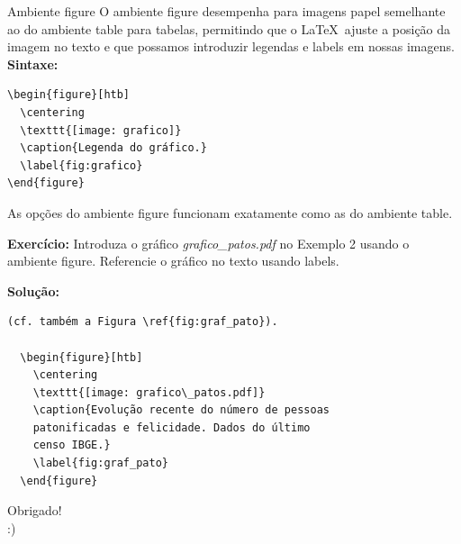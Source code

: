 \documentclass[12pt]{beamer}
\begin{document}
\begin{frame}[fragile]{Ambiente figure}
O ambiente figure desempenha para imagens papel semelhante ao do ambiente table para tabelas, permitindo que o \LaTeX\ ajuste a posição da imagem no texto e que possamos introduzir legendas e labels em nossas imagens.\\

\textbf{Sintaxe: }
\begin{verbatim}
\begin{figure}[htb]
  \centering
  \texttt{[image: grafico]}
  \caption{Legenda do gráfico.}
  \label{fig:grafico}
\end{figure}
\end{verbatim}

As opções do ambiente figure funcionam exatamente como as do ambiente table.
\end{frame}

\begin{frame}[fragile]
\textbf{Exercício: } Introduza o gráfico
 \emph{grafico\_patos.pdf} no Exemplo 2 usando o ambiente figure. Referencie o gráfico no texto usando labels.

\pause

\textbf{Solução: }
\begin{verbatim}
(cf. também a Figura \ref{fig:graf_pato}).

  \begin{figure}[htb]
    \centering
    \texttt{[image: grafico\_patos.pdf]}
    \caption{Evolução recente do número de pessoas
    patonificadas e felicidade. Dados do último
    censo IBGE.}
    \label{fig:graf_pato}
  \end{figure}
\end{verbatim}

\end{frame}

\begin{frame}
  \begin{center}
    \large Obrigado!\\
    :)
  \end{center}
\end{frame}
\end{document}
